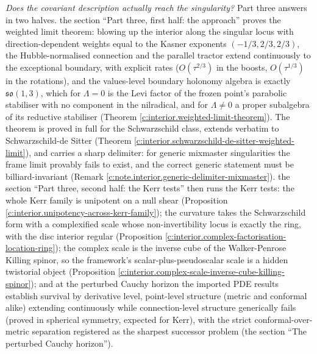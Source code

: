 \documentclass[11pt]{article}
\theoremstyle{definition}
\theoremstyle{plain}
\begin{document}
\emph{Does the covariant description actually reach the singularity?} Part three answers in two halves. the section ``Part three, first half: the approach'' proves the weighted limit theorem: blowing up the interior along the singular locus with direction-dependent weights equal to the Kasner exponents $(-1/3, 2/3, 2/3)$, the Hubble-normalised connection and the parallel tractor extend continuously to the exceptional boundary, with explicit rates ($O(\tau^{2/3})$ in the boosts, $O(\tau^{1/3})$ in the rotations), and the values-level boundary holonomy algebra is exactly $\mathfrak{so}(1,3)$, which for $\Lambda = 0$ is the Levi factor of the frozen point's parabolic stabiliser with no component in the nilradical, and for $\Lambda \neq 0$ a proper subalgebra of its reductive stabiliser (Theorem \ref{c:interior.weighted-limit-theorem}). The theorem is proved in full for the Schwarzschild class, extends verbatim to Schwarzschild-de Sitter (Theorem \ref{c:interior.schwarzschild-de-sitter-weighted-limit}), and carries a sharp delimiter: for generic mixmaster singularities the frame limit provably fails to exist, and the correct generic statement must be billiard-invariant (Remark \ref{c:note.interior.generic-delimiter-mixmaster}). the section ``Part three, second half: the Kerr tests'' then runs the Kerr tests: the whole Kerr family is unipotent on a null shear (Proposition \ref{c:interior.unipotency-across-kerr-family}); the curvature takes the Schwarzschild form with a complexified scale whose non-invertibility locus is exactly the ring, with the disc interior regular (Proposition \ref{c:interior.complex-factorisation-location-ring}); the complex scale is the inverse cube of the Walker-Penrose Killing spinor, so the framework's scalar-plus-pseudoscalar scale is a hidden twistorial object (Proposition \ref{c:interior.complex-scale-inverse-cube-killing-spinor}); and at the perturbed Cauchy horizon the imported PDE results establish survival by derivative level, point-level structure (metric and conformal alike) extending continuously while connection-level structure generically fails (proved in spherical symmetry, expected for Kerr), with the strict conformal-over-metric separation registered as the sharpest successor problem (the section ``The perturbed Cauchy horizon'').
\end{document}
